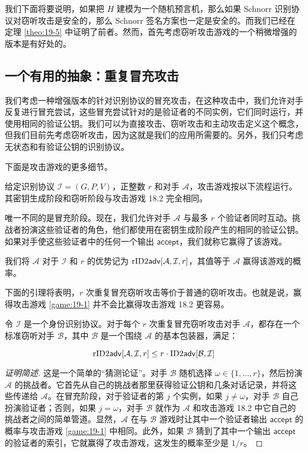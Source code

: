 我们下面将要说明，如果把 $H$ 建模为一个随机预言机，那么如果 Schnorr 识别协议对窃听攻击是安全的，那么 Schnorr 签名方案也一定是安全的。而我们已经在定理 \ref{theo:19-5} 中证明了前者。然而，首先考虑窃听攻击游戏的一个稍微增强的版本是有好处的。

\subsection{一个有用的抽象：重复冒充攻击}

我们考虑一种增强版本的针对识别协议的冒充攻击，在这种攻击中，我们允许对手反复进行冒充尝试，这些冒充尝试针对的是验证者的不同实例，它们同时运行，并使用相同的验证公钥。我们可以为直接攻击、窃听攻击和主动攻击定义这个概念，但我们目前先考虑窃听攻击，因为这就是我们的应用所需要的。另外，我们只考虑无状态和有验证公钥的识别协议。

下面是攻击游戏的更多细节。

\begin{game}[$r$ 次重复冒充窃听攻击]\label{game:19-1}
给定识别协议 $\mathcal{I}=(G,P,V)$，正整数 $r$ 和对手 $\mathcal{A}$，攻击游戏按以下流程运行。其密钥生成阶段和窃听阶段与攻击游戏 18.2 完全相同。

唯一不同的是冒充阶段。现在，我们允许对手 $\mathcal{A}$ 与最多 $r$ 个验证者同时互动。挑战者扮演这些验证者的角色，他们都使用在密钥生成阶段产生的相同的验证公钥。如果对手使这些验证者中的任何一个输出 $\mathsf{accept}$，我们就称它赢得了该游戏。

我们将 $\mathcal{A}$ 对于 $\mathcal{I}$ 和 $r$ 的优势记为 ${\rm rID2\mathsf{adv}}[\mathcal{A},\mathcal{I},r]$，其值等于 $\mathcal{A}$ 赢得该游戏的概率。
\end{game}

下面的引理将表明，$r$ 次重复冒充窃听攻击等价于普通的窃听攻击。也就是说，赢得攻击游戏 \ref{game:19-1} 并不会比赢得攻击游戏 18.2 更容易。

\begin{lemma}\label{theo:19-6}
令 $\mathcal{I}$ 是一个身份识别协议。对于每个 $r$ 次重复冒充窃听攻击对手 $\mathcal{A}$，都存在一个标准窃听对手 $\mathcal{B}$，其中 $\mathcal{B}$ 是一个围绕 $\mathcal{A}$ 的基本包装器，满足：

\begin{equation}
{\rm rID2\mathsf{adv}}[\mathcal{A},\mathcal{I},r]\leq r\cdot{\rm ID2\mathsf{adv}}[\mathcal{B}, \mathcal{I}]
\end{equation}

\end{lemma}

\begin{proof}[证明简述]
这是一个简单的“猜测论证”。对手 $\mathcal{B}$ 随机选择 $\omega\in\{1,\dots,r\}$，然后扮演 $\mathcal{A}$ 的挑战者。它首先从自己的挑战者那里获得验证公钥和几条对话记录，并将这些传递给 $\mathcal{A}$。在冒充阶段，对于验证者的第 $j$ 个实例，如果 $j\neq\omega$，对手 $\mathcal{B}$ 自己扮演验证者；否则，如果 $j=\omega$，对手 $\mathcal{B}$ 就作为 $\mathcal{A}$ 和攻击游戏 18.2 中它自己的挑战者之间的简单管道。显然，$\mathcal{A}$ 在与 $\mathcal{B}$ 游戏时让其中一个验证者输出 $\mathsf{accept}$ 的概率与攻击游戏 \ref{game:19-1} 中相同。此外，如果 $\mathcal{B}$ 猜到了其中一个输出 $\mathsf{accept}$ 的验证者的索引，它就赢得了攻击游戏，这发生的概率至少是 ${1}/{r}$。
\end{proof}

